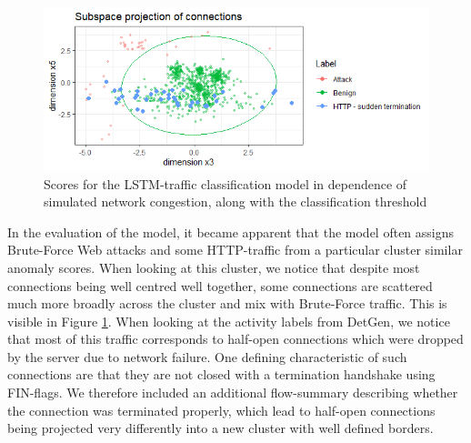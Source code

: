 \documentclass{article}
\begin{document}
\begin{figure}
\centering
\includegraphics[width=1\textwidth]{images/Subspace_projection.png}
\caption{Scores for the LSTM-traffic classification model in dependence of simulated network congestion, along with the classification threshold}\label{fig:Subspace_projection}
\end{figure}

In the evaluation of the model, it became apparent that the model often assigns Brute-Force Web attacks and some HTTP-traffic from a particular cluster similar anomaly scores. When looking at this cluster, we notice that despite most connections being well centred well together, some 
connections are scattered much more broadly across the cluster and mix with Brute-Force traffic.
This is visible in Figure \ref{fig:Subspace_projection}. When looking at the activity labels from DetGen, we notice that most of this traffic corresponds to half-open connections which were dropped by the server due to network failure. One defining characteristic of such connections are that they are not closed with a termination handshake using FIN-flags. We therefore included an additional flow-summary describing whether the connection was terminated properly, which lead to half-open connections being projected very differently into a new cluster with well defined borders.
\end{document}
